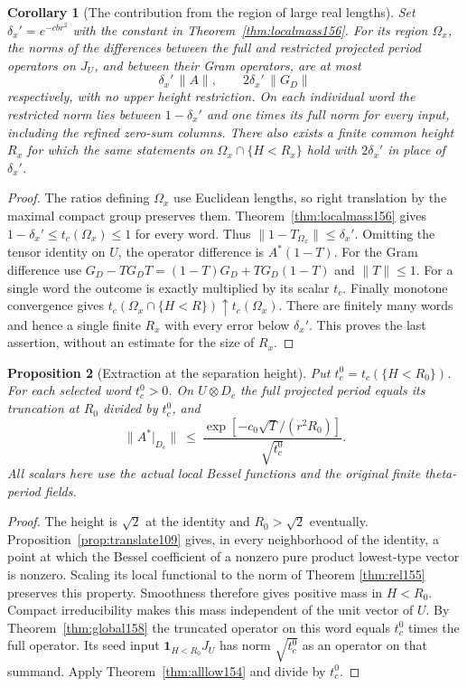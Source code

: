 \documentclass[a4paper,11pt]{article}
\newtheorem{proposition}{Proposition}[section]
\newtheorem{corollary}[proposition]{Corollary}
\theoremstyle{definition}
\theoremstyle{remark}
\numberwithin{equation}{section}
\begin{document}
\begin{corollary}[The contribution from the region of large real lengths]
\label{cor:recovery158}
Set \(\delta_x'=e^{-c b r^2}\) with the constant in
Theorem~\ref{thm:localmass156}. For its region \(\Omega_x\),
the norms of the differences between the full and restricted
projected period operators on \(J_U\), and between their Gram
operators, are at most
\[
           \delta_x'\,\|A\|,\qquad 2\delta_x'\,\|G_D\|
\]
respectively, with no upper height restriction. On each
individual word the restricted norm lies between \(1-\delta_x'\)
and one times its full norm for every input, including the
refined zero-sum columns. There also exists a finite common
height \(R_x\) for which the same statements on
\(\Omega_x\cap\{H<R_x\}\) hold with \(2\delta_x'\) in place
of \(\delta_x'\).
\end{corollary}
\begin{proof}
The ratios defining \(\Omega_x\) use Euclidean lengths, so
right translation by the maximal compact group preserves them.
Theorem~\ref{thm:localmass156} gives
\(1-\delta_x'\le t_c(\Omega_x)\le1\) for every word. Thus
\(\|1-T_{\Omega_x}\|\le\delta_x'\). Omitting the tensor
identity on \(U\), the operator difference is \(A^*(1-T)\).
For the Gram difference use
\(G_D-TG_D T=(1-T)G_D+TG_D(1-T)\) and \(\|T\|\le1\).
For a single word the outcome is exactly multiplied by its
scalar \(t_c\). Finally monotone convergence gives
\(t_c(\Omega_x\cap\{H<R\})\uparrow t_c(\Omega_x)\). There
are finitely many words and hence a single finite \(R_x\)
with every error below \(\delta_x'\). This proves the last
assertion, without an estimate for the size of \(R_x\).
\end{proof}

\begin{proposition}[Extraction at the separation height]
\label{prop:cut158}
Put \(t_c^0=t_c(\{H<R_0\})\). For each selected word \(t_c^0>0\).
On \(U\otimes D_c\) the full projected period equals its
truncation at \(R_0\) divided by \(t_c^0\), and
\[
 \bigl\|A^*|_{D_c}\bigr\|
       \ \le\ \frac{\exp[-c_0\sqrt T/(r^2R_0)]}{\sqrt{t_c^0}} .
\]
All scalars here use the actual local Bessel functions and
the original finite theta-period fields.
\end{proposition}
\begin{proof}
The height is \(\sqrt2\) at the identity and \(R_0>\sqrt2\)
eventually. Proposition~\ref{prop:translate109} gives, in
every neighborhood of the identity, a point at which the
Bessel coefficient of a nonzero pure product lowest-type
vector is nonzero. Scaling its local functional to the norm
of Theorem \ref{thm:rel155} preserves this property. Smoothness
therefore gives positive mass in \(H<R_0\). Compact
irreducibility makes this mass independent of the unit vector
of \(U\). By Theorem~\ref{thm:global158} the truncated
operator on this word equals \(t_c^0\) times the full
operator. Its seed input \(\mathbf1_{H<R_0}J_U\) has norm
\(\sqrt{t_c^0}\) as an operator on that summand. Apply
Theorem~\ref{thm:alllow154} and divide by \(t_c^0\).
\end{proof}
\end{document}
